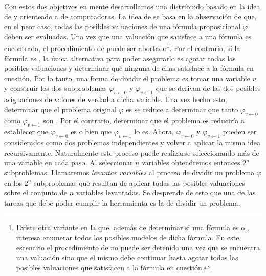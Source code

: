Con estos dos objetivos en mente desarrollamos una \ssolver distribuido basado
en la idea de \gp y orienteado a \clusters de computadoras. La idea de \gp se
basa en la observación de que, en el peor caso, todas las posibles valuaciones
de una fórmula proposicional $\varphi$ deben ser evaluadas. Una vez que una
valuación que satisface a una fórmula es encontrada, el procedimiento de
\ssolving puede ser abortado\footnote{Existe otra variante en la que, además
de determinar si una fórmula es \sat o \unsat, interesa enumerar todos los
posibles modelos de dicha fórmula. En este escenario el procedimiento de
\ssolving no puede ser detenido una vez que se encuentra una valuación sino
que el mismo debe continuar hasta agotar todas las posibles valuaciones que
satisfacen a la fórmula en cuestión.}. Por el contrario, si la fórmula es
\unsat, la única alternativa para poder asegurarlo es agotar todas las
posibles valuaciones y determinar que ninguna de ellas satisface a la fórmula
en cuestión. Por lo tanto, una forma de dividir el problema es tomar una
variable $v$ y construir los dos subproblemas $\varphi_{v \leftarrow 0}$ y
$\varphi_{v \leftarrow 1}$ que se derivan de las dos posibles asignaciones de
valores de verdad a dicha variable. Una vez hecho esto, determinar que el
problema original $\varphi$ es \unsat se reduce a determinar que tanto
$\varphi_{v \leftarrow 0}$ como $\varphi_{v \leftarrow 1}$ son \unsat. Por el
contrario, determinar que el problema es \sat reduciría a establecer que
$\varphi_{v \leftarrow 0}$ es \sat o bien que $\varphi_{v \leftarrow 1}$ lo
es. Ahora, $\varphi_{v \leftarrow 0}$ y $\varphi_{v \leftarrow 1}$ pueden ser
considerados como dos problemas independientes y volver a aplicar la misma
idea recursivamente. Naturalmente este proceso puede realizarse seleccionando
más de una variable en cada paso. Al seleccionar $n$ variables obtendremos
entonces $2^n$ subproblemas. Llamaremos \emph{levantar variables} al proceso
de dividir un problema $\varphi$ en los $2^n$ subproblemas que resultan de
aplicar todas las posibles valuaciones sobre el conjunto de $n$ variables
levantadas. Se desprende de esto que una de las tareas que debe poder cumplir
la herramienta es la de dividir un problema.



